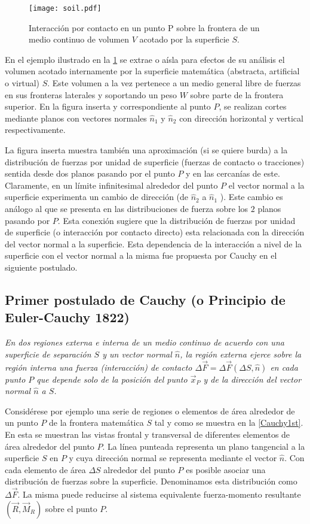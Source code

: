 \documentclass[../notas medios.tex]{subfiles}
\begin{document}
\begin{figure}[H]
\centering
	\texttt{[image: soil.pdf]}
	\caption{Interacción por contacto en un punto P sobre la frontera de un medio continuo de volumen $V$ acotado por la superficie $S$.}
	\label{soil}
\end{figure}

En el ejemplo ilustrado en la \cref{soil} se extrae o aísla para efectos de su
análisis el volumen acotado internamente por la superficie matemática
(abstracta, artificial o virtual) $S$. Este volumen a la vez pertenece a un
medio general libre de fuerzas en sus fronteras laterales y soportando un peso
$W$ sobre parte de la frontera superior. En la figura inserta y correspondiente
al punto $P$, se realizan cortes mediante planos con vectores normales ${\hat
n_1}$ y ${\hat n_2}$ con dirección horizontal y vertical respectivamente.

La figura inserta muestra también una aproximación (si se quiere burda) a la
distribución de fuerzas por unidad de superficie (fuerzas de contacto o
tracciones) sentida desde dos planos pasando por el punto $P$ y en las cercanías
de este. Claramente, en un límite infinitesimal alrededor del punto $P$ el
vector normal a la superficie experimenta un cambio de dirección (de ${\hat
n_2}$ a ${\hat n_1}$  ). Este cambio es análogo al que se presenta en las
distribuciones de fuerza sobre los $2$ planos pasando por $P$. Esta conexión
sugiere que la distribución de fuerzas por unidad de superficie (o interacción
por contacto directo) esta relacionada con la dirección del vector normal a la
superficie. Esta dependencia de la interacción a nivel de la superficie con el
vector normal a la misma fue propuesta por Cauchy en el siguiente postulado.

\subsection{Primer postulado de Cauchy (o Principio de Euler-Cauchy 1822)}
\textit{En dos regiones externa e interna de un medio continuo de acuerdo con
una superficie de separación $S$ y un vector normal $\hat n$, la región externa
ejerce sobre la región interna una fuerza (interacción) de contacto $\Delta \vec
F = \Delta \vec F(\Delta S,\hat n)$ en cada punto $P$ que depende solo de la
posición del punto ${\vec x_P}$ y de la dirección del vector normal $\hat n$ a $S$.}

Considérese por ejemplo una serie de regiones o elementos de área alrededor de
un punto $P$ de la frontera matemática $S$ tal y como se muestra en la
\cref{Cauchy1st}. En esta se muestran las vistas frontal y transversal de
diferentes elementos de área alrededor del punto $P$. La línea punteada
representa un plano tangencial a la superficie $S$ en $P$ y cuya dirección
normal se representa mediante el vector $\hat{n}$. Con cada elemento de área
$\Delta S$ alrededor del punto $P$ es posible asociar una distribución de
fuerzas sobre la superficie. Denominamos esta distribución como $\Delta \vec F$.
La misma puede reducirse al sistema equivalente fuerza-momento resultante $(\vec R,{\vec M_R})$ sobre el punto $P$.
\end{document}
